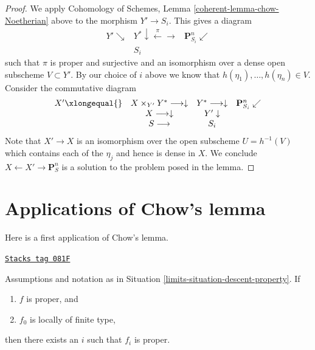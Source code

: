 \begin{proof}
\medskip\noindent
We apply Cohomology of Schemes, Lemma
\ref{coherent-lemma-chow-Noetherian} above to the morphism
$Y' \to S_i$. This gives a diagram
$$
\begin{array}{ccc}Y' \searrow & Y^* \downarrow\overset{\pi}{\longleftarrow}\longrightarrow & \mathbf{P}^n_{S_i} \swarrow \\  & S_i & \end{array}
$$
such that $\pi$ is proper and surjective and an isomorphism over
a dense open subscheme $V \subset Y'$. By our choice of $i$ above
we know that $h(\eta_1), \ldots, h(\eta_n) \in V$. Consider
the commutative diagram
$$
\begin{array}{cccc}X' \xlongequal{} & X \times_{Y'} Y^* \longrightarrow\downarrow & Y^* \longrightarrow\downarrow & \mathbf{P}^n_{S_i} \swarrow \\  & X \longrightarrow\downarrow & Y' \downarrow &  \\  & S \longrightarrow & S_i & \end{array}
$$
Note that $X' \to X$ is an isomorphism over the open subscheme
$U = h^{-1}(V)$ which contains each of the $\eta_j$ and hence is
dense in $X$. We conclude $X \leftarrow X' \rightarrow \mathbf{P}^n_S$
is a solution to the problem posed in the lemma.
\end{proof}

\section{Applications of Chow's lemma}
\label{limits-section-apply-chow}
Here is a first application of Chow's lemma.

\begin{lemma}
\label{limits-lemma-eventually-proper}
\href{https://stacks.math.columbia.edu/tag/081F}{\texttt{Stacks tag 081F}}


Assumptions and notation as in Situation \ref{limits-situation-descent-property}.
If
\begin{enumerate}
\item $f$ is proper, and
\item $f_0$ is locally of finite type,
\end{enumerate}
then there exists an $i$ such that $f_i$ is proper.
\end{lemma}

